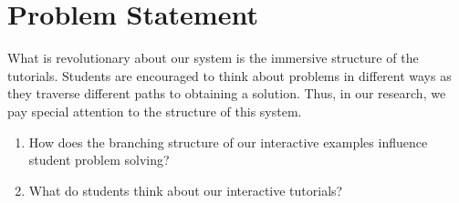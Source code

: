 \section{Problem Statement}

What is revolutionary about our system is the immersive structure of the tutorials. Students are encouraged to think about problems in different ways as they traverse different paths to obtaining a solution. Thus, in our research, we pay special attention to the structure of this system.

\begin{enumerate}
\item How does the branching structure of our interactive examples influence student problem solving?
\item What do students think about our interactive tutorials?
\end{enumerate}